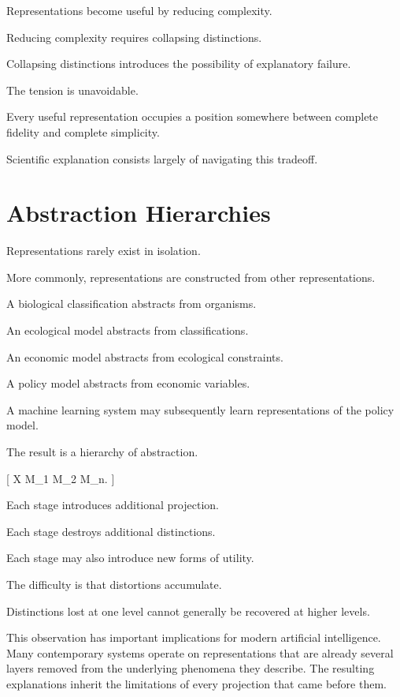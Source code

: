 \documentclass[11pt,oneside,openany]{book}
\begin{document}
Representations become useful by reducing complexity.

Reducing complexity requires collapsing distinctions.

Collapsing distinctions introduces the possibility of explanatory failure.

The tension is unavoidable.

Every useful representation occupies a position somewhere between complete fidelity and complete simplicity.

Scientific explanation consists largely of navigating this tradeoff.

\section{Abstraction Hierarchies}

Representations rarely exist in isolation.

More commonly, representations are constructed from other representations.

A biological classification abstracts from organisms.

An ecological model abstracts from classifications.

An economic model abstracts from ecological constraints.

A policy model abstracts from economic variables.

A machine learning system may subsequently learn representations of the policy model.

The result is a hierarchy of abstraction.

[
\mathcal X
\rightarrow
\mathcal M_1
\rightarrow
\mathcal M_2
\rightarrow
\cdots
\rightarrow
\mathcal M_n.
]

Each stage introduces additional projection.

Each stage destroys additional distinctions.

Each stage may also introduce new forms of utility.

The difficulty is that distortions accumulate.

Distinctions lost at one level cannot generally be recovered at higher levels.

This observation has important implications for modern artificial intelligence. Many contemporary systems operate on representations that are already several layers removed from the underlying phenomena they describe. The resulting explanations inherit the limitations of every projection that came before them.
\end{document}
